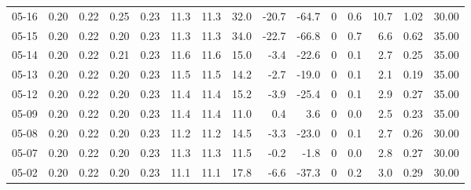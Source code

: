 \begin{threeparttable}
{\begin{tabular}{lrrrrrrrrrrrrrr}
  05-16 &          0.20 &          0.22 &          0.25 &        0.23 &                11.3 &               11.3 &                32.0 &      -20.7 &        -64.7 &              0 &                 0.6 &             10.7 &            1.02 &                  30.00 \\
  05-15 &          0.20 &          0.22 &          0.20 &        0.23 &                11.3 &               11.3 &                34.0 &      -22.7 &        -66.8 &              0 &                 0.7 &              6.6 &            0.62 &                  35.00 \\
  05-14 &          0.20 &          0.22 &          0.21 &        0.23 &                11.6 &               11.6 &                15.0 &       -3.4 &        -22.6 &              0 &                 0.1 &              2.7 &            0.25 &                  35.00 \\
  05-13 &          0.20 &          0.22 &          0.20 &        0.23 &                11.5 &               11.5 &                14.2 &       -2.7 &        -19.0 &              0 &                 0.1 &              2.1 &            0.19 &                  35.00 \\
  05-12 &          0.20 &          0.22 &          0.20 &        0.23 &                11.4 &               11.4 &                15.2 &       -3.9 &        -25.4 &              0 &                 0.1 &              2.9 &            0.27 &                  35.00 \\
  05-09 &          0.20 &          0.22 &          0.20 &        0.23 &                11.4 &               11.4 &                11.0 &        0.4 &          3.6 &              0 &                 0.0 &              2.5 &            0.23 &                  35.00 \\
  05-08 &          0.20 &          0.22 &          0.20 &        0.23 &                11.2 &               11.2 &                14.5 &       -3.3 &        -23.0 &              0 &                 0.1 &              2.7 &            0.26 &                  30.00 \\
  05-07 &          0.20 &          0.22 &          0.20 &        0.23 &                11.3 &               11.3 &                11.5 &       -0.2 &         -1.8 &              0 &                 0.0 &              2.8 &            0.27 &                  30.00 \\
  05-02 &          0.20 &          0.22 &          0.20 &        0.23 &                11.1 &               11.1 &                17.8 &       -6.6 &        -37.3 &              0 &                 0.2 &              3.0 &            0.29 &                  30.00 \\

\end{tabular}}
\end{threeparttable}
